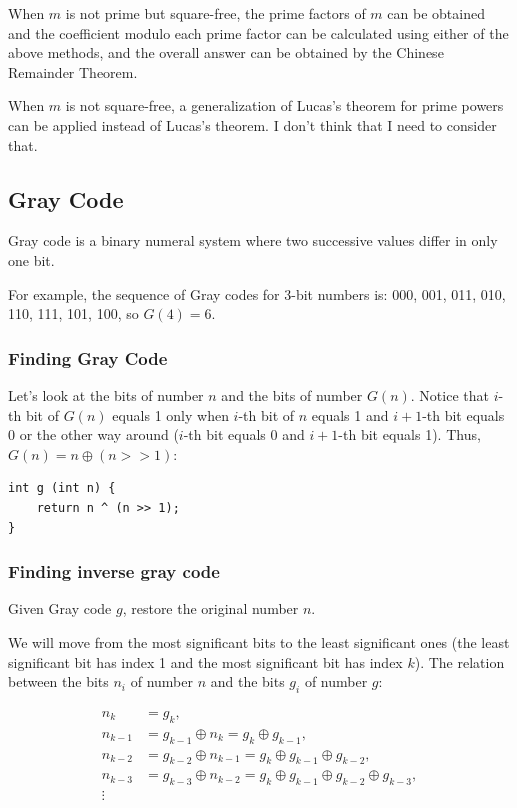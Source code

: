 \documentclass[8pt, a4paper, oneside, twocolumn]{extarticle}
\begin{document}
When $m$ is not prime but square-free, the prime factors of $m$ can be obtained and the coefficient modulo each prime factor can be calculated using either of the above methods, and the overall answer can be obtained by the Chinese Remainder Theorem.

When $m$ is not square-free, a generalization of Lucas's theorem for prime powers can be applied instead of Lucas's theorem. I don't think that I need to consider that.
\subsection{Gray Code}
Gray code is a binary numeral system where two successive values differ in only one bit.

For example, the sequence of Gray codes for 3-bit numbers is: 000, 001, 011, 010, 110, 111, 101, 100, so $G(4) = 6$.
\subsubsection{Finding Gray Code}
Let's look at the bits of number $n$ and the bits of number $G(n)$. Notice that $i$-th bit of $G(n)$ equals 1 only when $i$-th bit of $n$ equals 1 and $i + 1$-th bit equals 0 or the other way around ($i$-th bit equals 0 and $i + 1$-th bit equals 1). Thus, $G(n) = n \oplus (n >> 1)$:
\begin{verbatim}
int g (int n) {
    return n ^ (n >> 1);
}
\end{verbatim}
\subsubsection{Finding inverse gray code}
Given Gray code $g$, restore the original number $n$.

We will move from the most significant bits to the least significant ones (the least significant bit has index 1 and the most significant bit has index $k$). The relation between the bits $n_i$ of number $n$ and the bits $g_i$ of number $g$:

 \begin{eqnarray}n_k &= g_k, \\ n_{k-1} &= g_{k-1} \oplus n_k = g_k \oplus g_{k-1}, \\ n_{k-2} &= g_{k-2} \oplus n_{k-1} = g_k \oplus g_{k-1} \oplus g_{k-2}, \\ n_{k-3} &= g_{k-3} \oplus n_{k-2} = g_k \oplus g_{k-1} \oplus g_{k-2} \oplus g_{k-3}, \\ \vdots \end{eqnarray}
\end{document}
